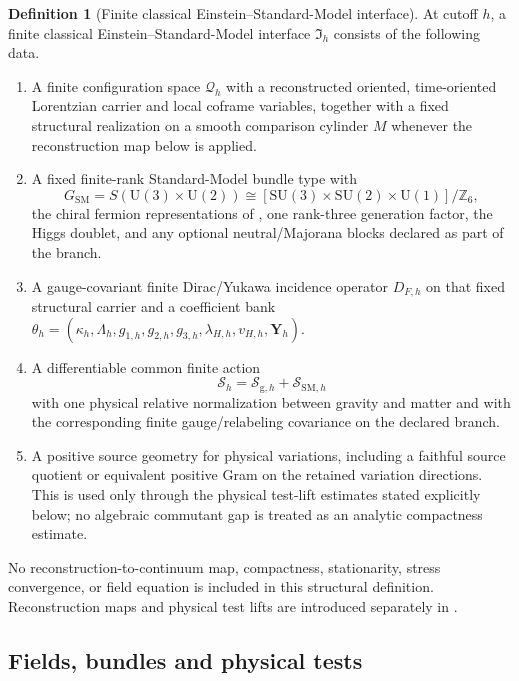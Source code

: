 \documentclass[11pt]{article}
\numberwithin{equation}{section}
\theoremstyle{definition}
\newtheorem{definition}[definition]{Definition}
\theoremstyle{remark}
\newcommand{\Z}{\mathbb Z}
\newcommand{\SU}{\mathrm{SU}}
\newcommand{\U}{\mathrm U}
\newcommand{\Sact}{\mathscr S}
\newcommand{\Iface}{\mathfrak I}
\begin{document}
\begin{definition}[Finite classical Einstein--Standard-Model interface]
\label{def:finite-interface}
At cutoff $h$, a finite classical Einstein--Standard-Model interface $\Iface_h$ consists of the following data.
\begin{enumerate}[label=\textup{(I\arabic*)},leftmargin=3.2em]
\item A finite configuration space $\mathcal Q_h$ with a reconstructed oriented, time-oriented Lorentzian carrier and local coframe variables, together with a fixed structural realization on a smooth comparison cylinder $M$ whenever the reconstruction map below is applied.
\item A fixed finite-rank Standard-Model bundle type with
\begin{equation}
 G_{\mathrm{SM}}=S(\U(3)\times\U(2))
 \cong[\SU(3)\times\SU(2)\times\U(1)]/\Z_6,
 \label{eq:gauge-group}
\end{equation}
the chiral fermion representations of , one rank-three generation factor, the Higgs doublet, and any optional neutral/Majorana blocks declared as part of the branch.
\item A gauge-covariant finite Dirac/Yukawa incidence operator $D_{F,h}$ on that fixed structural carrier and a coefficient bank $\theta_h=(\kappa_h,\Lambda_h,g_{1,h},g_{2,h},g_{3,h},\lambda_{H,h},v_{H,h},\boldsymbol Y_h)$.
\item A differentiable common finite action
\[
 \Sact_h=\Sact_{\mathrm g,h}+\Sact_{\mathrm{SM},h}
\]
with one physical relative normalization between gravity and matter and with the corresponding finite gauge/relabeling covariance on the declared branch.
\item A positive source geometry for physical variations, including a faithful source quotient or equivalent positive Gram on the retained variation directions. This is used only through the physical test-lift estimates stated explicitly below; no algebraic commutant gap is treated as an analytic compactness estimate.
\end{enumerate}
No reconstruction-to-continuum map, compactness, stationarity, stress convergence, or field equation is included in this structural definition. Reconstruction maps and physical test lifts are introduced separately in .
\end{definition}

\subsection{Fields, bundles and physical tests}
\end{document}
